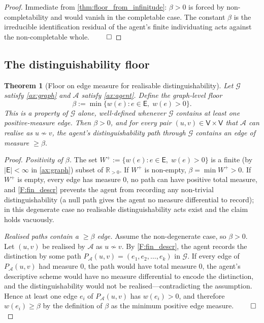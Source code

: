 \documentclass[11pt,a4paper]{article}
\theoremstyle{thmstyle}
\newtheorem{theorem}{Theorem}[section]
\theoremstyle{definition}
\theoremstyle{remark}
\newcommand{\R}{\mathbb{R}}
\newcommand{\Graph}{\mathcal{G}}
\newcommand{\Vrt}{\mathsf{V}}
\newcommand{\Edg}{\mathsf{E}}
\newcommand{\Agent}{\mathcal{A}}
\newcommand{\floor}{\beta}
\begin{document}
\begin{proof}
Immediate from \cref{thm:floor_from_infinitude}: $\floor > 0$ is
forced by non-completability and would vanish in the completable
case. The constant $\floor$ is the irreducible identification
residual of the agent's finite individuating acts against the
non-completable whole. $\qed$
\end{proof}

\subsection{The distinguishability floor}

\begin{theorem}[Floor on edge measure for realisable
distinguishability]
\label{thm:floor}
Let $\Graph$ satisfy \cref{ax:graph} and $\Agent$ satisfy
\cref{ax:agent}. Define the graph-level floor
\[
  \floor := \min\{w(e) : e \in \Edg,\; w(e) > 0\}.
\]
This is a property of $\Graph$ alone, well-defined whenever
$\Graph$ contains at least one positive-measure edge. Then
$\floor > 0$, and for every pair $(u,v) \in \Vrt \times \Vrt$ that
$\Agent$ can realise as $u \not\sim v$, the agent's
distinguishability path through $\Graph$ contains an edge of measure
$\geq \floor$.
\end{theorem}

\begin{proof}
\emph{Positivity of $\floor$.} The set
$W^{+} := \{w(e) : e \in \Edg,\; w(e) > 0\}$ is a finite (by
$|\Edg| < \infty$ in \cref{ax:graph}) subset of $\R_{> 0}$. If
$W^{+}$ is non-empty, $\floor = \min W^{+} > 0$. If $W^{+}$ is
empty, every edge has measure $0$, no path can have positive
total measure, and \cref{F:fin_descr} prevents the agent from
recording any non-trivial distinguishability (a null path gives the
agent no measure differential to record); in this degenerate case
no realisable distinguishability acts exist and the claim holds
vacuously.

\emph{Realised paths contain a $\geq \floor$ edge.} Assume the
non-degenerate case, so $\floor > 0$. Let $(u,v)$ be realised by
$\Agent$ as $u \not\sim v$. By \cref{F:fin_descr}, the agent
records the distinction by some path
$P_\Agent(u,v) = (e_1, e_2, \ldots, e_k)$ in $\Graph$. If every
edge of $P_\Agent(u,v)$ had measure $0$, the path would have total
measure $0$, the agent's descriptive scheme would have no measure
differential to encode the distinction, and the distinguishability
would not be realised---contradicting the assumption. Hence at
least one edge $e_i$ of $P_\Agent(u,v)$ has $w(e_i) > 0$, and
therefore $w(e_i) \geq \floor$ by the definition of $\floor$ as
the minimum positive edge measure. $\qed$
\end{proof}
\end{document}
